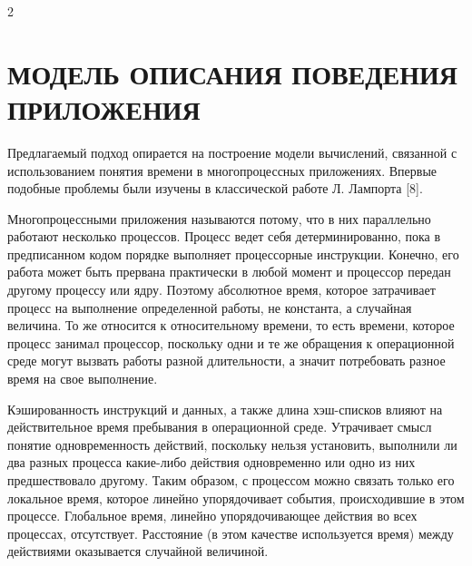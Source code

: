\begin{multicols}{2}
\begin{figure}
\vspace*{-9pt}


\vspace*{-3pt}

\end{figure}



\section{МОДЕЛЬ ОПИСАНИЯ ПОВЕДЕНИЯ ПРИЛОЖЕНИЯ}



Предлагаемый подход опирается на построение модели вычислений, связанной с использованием понятия времени в многопроцессных приложениях. Впервые подобные проблемы были изучены в классической работе Л. Лампорта [8].



Многопроцессными приложения называются потому, что в них параллельно работают несколько процессов. Процесс ведет себя детерминированно, пока в предписанном кодом порядке выполняет процессорные инструкции. Конечно, его работа может быть прервана практически в любой момент и процессор передан другому процессу или ядру. Поэтому абсолютное время, которое затрачивает процесс на выполнение определенной работы, не  константа, а случайная  величина. То же  относится к относительному времени, то есть времени, которое процесс занимал процессор,  поскольку одни и те же обращения к операционной среде могут вызвать работы разной длительности, а значит потребовать разное время на свое выполнение.



Кэшированность инструкций и данных, а также длина хэш-списков влияют на действительное время пребывания в операционной среде. Утрачивает смысл понятие одновременность действий, поскольку  нельзя установить, выполнили ли два разных процесса какие-либо действия одновременно или одно из них предшествовало другому. Таким образом, с процессом можно связать только его локальное время, которое линейно упорядочивает события,  происходившие в этом процессе.  Глобальное время, линейно упорядочивающее действия во всех процессах, отсутствует. Расстояние (в этом качестве используется время) между действиями оказывается случайной величиной.




\end{multicols}
